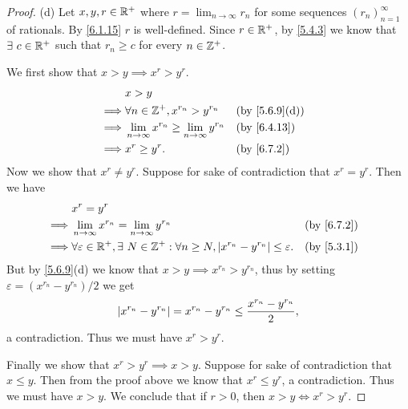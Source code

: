 \begin{proof}{(d)}
  Let \(x, y, r \in \mathbb{R}^+\) where \(r = \lim_{n \to \infty} r_n\) for some sequences \((r_n)_{n = 1}^\infty\) of rationals.
  By \cref{6.1.15} \(r\) is well-defined.
  Since \(r \in \mathbb{R}^+\), by \cref{5.4.3} we know that \(\exists\ c \in \mathbb{R}^+\) such that \(r_n \geq c\) for every \(n \in \mathbb{Z}^+\).

  We first show that \(x > y \implies x^r > y^r\).
  \begin{align*}
             & x > y                                                                                         \\
    \implies & \forall n \in \Z^+, x^{r_n} > y^{r_n}                        &  & \text{(by \cref{5.6.9}(d))} \\
    \implies & \lim_{n \to \infty} x^{r_n} \geq \lim_{n \to \infty} y^{r_n} &  & \text{(by \cref{6.4.13})}   \\
    \implies & x^r \geq y^r.                                                &  & \text{(by \cref{6.7.2})}
  \end{align*}
  Now we show that \(x^r \neq y^r\).
  Suppose for sake of contradiction that \(x^r = y^r\).
  Then we have
  \begin{align*}
             & x^r = y^r                                                                                                                                     \\
    \implies & \lim_{n \to \infty} x^{r_n} = \lim_{n \to \infty} y^{r_n}                                                       &  & \text{(by \cref{6.7.2})} \\
    \implies & \forall \varepsilon \in \R^+, \exists\ N \in \Z^+ : \forall n \geq N, \abs{x^{r_n} - y^{r_n}} \leq \varepsilon. &  & \text{(by \cref{5.3.1})}
  \end{align*}
  But by \cref{5.6.9}(d) we know that \(x > y \implies x^{r_n} > y^{r_n}\), thus by setting \(\varepsilon = (x^{r_n} - y^{r_n}) / 2\) we get
  \[
    \left\lvert x^{r_n} - y^{r_n}\right\rvert = x^{r_n} - y^{r_n} \leq \dfrac{x^{r_n} - y^{r_n}}{2},
  \]
  a contradiction.
  Thus we must have \(x^r > y^r\).

  Finally we show that \(x^r > y^r \implies x > y\).
  Suppose for sake of contradiction that \(x \leq y\).
  Then from the proof above we know that \(x^r \leq y^r\), a contradiction.
  Thus we must have \(x > y\).
  We conclude that if \(r > 0\), then \(x > y \iff x^r > y^r\).
\end{proof}

